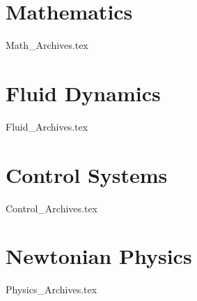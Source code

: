 \documentclass[class=report, 12pt, crop=false]{standalone}
\begin{document}
\begin{center}


\part{Mathematics}
{Math_Archives.tex}
\part{Fluid Dynamics}
{Fluid_Archives.tex}
\part{Control Systems}
{Control_Archives.tex}
\part{Newtonian Physics}
{Physics_Archives.tex}


\end{center}
\end{document}
